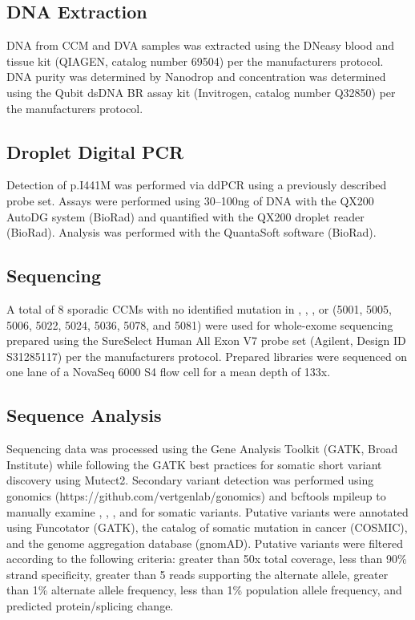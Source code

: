 \subsection{DNA Extraction}
	DNA from CCM and DVA samples was extracted using the DNeasy blood and tissue kit (QIAGEN, catalog number 69504) per the manufacturers protocol. DNA purity was determined by Nanodrop and concentration was determined using the Qubit dsDNA BR assay kit (Invitrogen, catalog number Q32850) per the manufacturers protocol. 

\subsection{Droplet Digital PCR}
Detection of  p.I441M was performed via ddPCR using a previously described probe set\citep{couto2015}. Assays were performed using 30--100ng of DNA with the QX200 AutoDG system (BioRad) and quantified with the QX200 droplet reader (BioRad). Analysis was performed with the QuantaSoft software (BioRad). 

\subsection{Sequencing}
	A total of 8 sporadic CCMs with no identified mutation in , , , or  (5001, 5005, 5006, 5022, 5024, 5036, 5078, and 5081) were used for whole-exome sequencing prepared using the SureSelect Human All Exon V7 probe set (Agilent, Design ID S31285117) per the manufacturers protocol. Prepared libraries were sequenced on one lane of a NovaSeq 6000 S4 flow cell for a mean depth of 133x. 

\subsection{Sequence Analysis}
	Sequencing data was processed using the Gene Analysis Toolkit (GATK, Broad Institute) while following the GATK best practices for somatic short variant discovery using Mutect2. Secondary variant detection was performed using gonomics (https://github.com/vertgenlab/gonomics) and bcftools mpileup to manually examine , , , and  for somatic variants. Putative variants were annotated using Funcotator (GATK), the catalog of somatic mutation in cancer (COSMIC), and the genome aggregation database (gnomAD). Putative variants were filtered according to the following criteria: greater than 50x total coverage, less than 90\% strand specificity, greater than 5 reads supporting the alternate allele, greater than 1\% alternate allele frequency, less than 1\% population allele frequency, and predicted protein/splicing change. 

